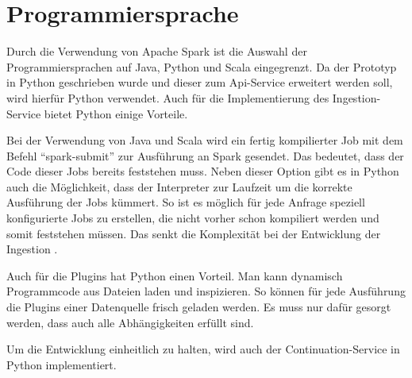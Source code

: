 \section{Programmiersprache}

Durch die Verwendung von Apache Spark ist die Auswahl der Programmiersprachen auf Java, Python und Scala eingegrenzt.
Da der Prototyp in Python geschrieben wurde und dieser zum Api-Service erweitert werden soll, wird hierfür Python verwendet.
Auch für die Implementierung des Ingestion-Service bietet Python einige Vorteile.

Bei der Verwendung von Java und Scala wird ein fertig kompilierter Job mit dem Befehl "`spark-submit"' zur Ausführung an Spark gesendet.
Das bedeutet, dass der Code dieser Jobs bereits feststehen muss.
Neben dieser Option gibt es in Python auch die Möglichkeit, dass der Interpreter zur Laufzeit um die korrekte Ausführung der Jobs kümmert.
So ist es möglich für jede Anfrage speziell konfigurierte Jobs zu erstellen, die nicht vorher schon kompiliert werden und somit feststehen müssen.
Das senkt die Komplexität bei der Entwicklung der Ingestion \parencite{pyspark-int}.

Auch für die Plugins hat Python einen Vorteil.
Man kann dynamisch Programmcode aus Dateien laden und inspizieren.
So können für jede Ausführung die Plugins einer Datenquelle frisch geladen werden.
Es muss nur dafür gesorgt werden, dass auch alle Abhängigkeiten erfüllt sind.

Um die Entwicklung einheitlich zu halten, wird auch der Continuation-Service in Python implementiert.